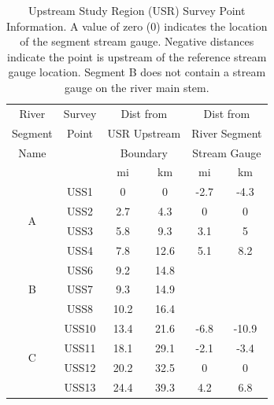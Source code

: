 \begin{table}[htbp]
	\centering
	\caption[Upstream Study Region (USR) Survey Point Information.]{Upstream Study Region (USR) Survey Point Information.  A value of zero (0) indicates the location of the segment stream gauge.  Negative distances indicate the point is upstream of the reference stream gauge location. Segment B does not contain a stream gauge on the river main stem.}
	\label{tab:USRSurveyLoc}
	\begin{tabular}{cccccc}
		\toprule
		River                       & Survey &  \multicolumn{2}{c}{Dist from}   &   \multicolumn{2}{c}{Dist from}   \\
		Segment                      & Point  & \multicolumn{2}{c}{USR Upstream} & \multicolumn{2}{c}{River Segment} \\
		Name                        &        &   \multicolumn{2}{c}{Boundary}   & \multicolumn{2}{c}{Stream Gauge}  \\
		\cmidrule(r{.5em}l){3-4} \cmidrule(r{.5em}l){5-6} &        &  mi  &            km             &  mi  &             km             \\ \toprule
		\multirow{4}{*}{A}                 &  USS1  &  0   &             0             & -2.7 &            -4.3            \\
		&  USS2  & 2.7  &            4.3            &  0   &             0              \\
		&  USS3  & 5.8  &            9.3            & 3.1  &             5              \\
		&  USS4  & 7.8  &           12.6            & 5.1  &            8.2             \\ \midrule
		\multirow{3}{*}{B}                 &  USS6  & 9.2  &           14.8            &      &  \\
		&  USS7  & 9.3  &           14.9            &      &  \\
		&  USS8  & 10.2 &           16.4            &      &  \\ \midrule
		\multirow{5}{*}{C}                 & USS10  & 13.4 &           21.6            & -6.8 &           -10.9            \\
		& USS11  & 18.1 &           29.1            & -2.1 &            -3.4            \\
		& USS12  & 20.2 &           32.5            &  0   &             0              \\
		& USS13  & 24.4 &           39.3            & 4.2  &            6.8             \\

\end{tabular}
\end{table}
